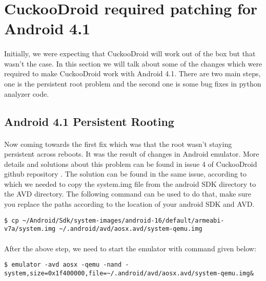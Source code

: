 \documentclass[../main.tex]{subfile}
\begin{document}
		\section{CuckooDroid required patching for Android 4.1}\label{sec:cuckoodroid_patching}
		\paragraph{} Initially, we were expecting that CuckooDroid will work out of the box but that wasn't the case. In this section we will talk about some of the changes which were required to make CuckooDroid work with Android 4.1. There are two main steps, one is the persistent root problem and the second one is some bug fixes in python analyzer code.
		
		\subsection{Android 4.1 Persistent Rooting}
		\paragraph{} Now coming towards the first fix which was that the root wasn't staying persistent across reboots. It was the result of changes in Android emulator. More details and solutions about this problem can be found in issue 4 of CuckooDroid github repository \cite{cuckoodroid_root_issue}. The solution can be found in the same issue, according to which we needed to copy the system.img file from the android SDK directory to the AVD directory. The following command can be used to do that, make sure you replace the paths according to the location of your android SDK and AVD.
		
		\begin{lstlisting}[numbers=none]
			$ cp ~/Android/Sdk/system-images/android-16/default/armeabi-v7a/system.img ~/.android/avd/aosx.avd/system-qemu.img
		\end{lstlisting}
		
		\paragraph{} After the above step, we need to start the emulator with command given below:
		\begin{lstlisting}[numbers=none]
			$ emulator -avd aosx -qemu -nand -system,size=0x1f400000,file=~/.android/avd/aosx.avd/system-qemu.img&
		\end{lstlisting}
		
\end{document}
